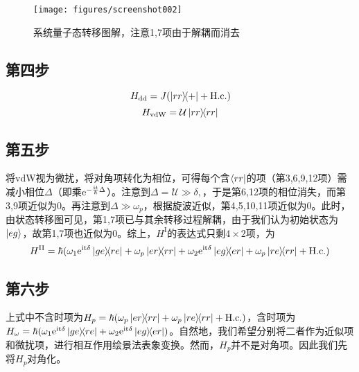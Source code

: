 \documentclass[
fontsetup = font-setup-open.tex,
titlesetup = titles-setup.tex
]{AJbook}
\numberwithin{equation}{section}
\begin{document}
\begin{figure}[htbp]
\centering
\texttt{[image: figures/screenshot002]}
\caption{系统量子态转移图解，注意1,7项由于解耦而消去}
\label{fig:screenshot002}
\end{figure}
\subsection{第四步}
\begin{equation}\label{key}
H_{\mathrm{dd}}=J(\ketbra{rr}{+}+\mathrm{H.c.})
\end{equation}
\begin{equation}\label{key}
H_{\mathrm{vdW}}=\mathcal{U}\ketbra{rr}{rr}
\end{equation}
\subsection{第五步}
将vdW视为微扰，将对角项转化为相位，可得每个含$ \bra{rr} $的项（第3,6,9,12项）需减小相位$ \Delta $（即乘$ \mathrm{e}^{-\frac{\mathrm{i}t}{\hbar} \Delta} $）。注意到$ \Delta=\mathcal{U}\gg\delta, $，于是第6,12项的相位消失，而第3,9项近似为0。再注意到$ \Delta\gg\omega_p $，根据旋波近似，第4,5,10,11项近似为0。此时，由状态转移图可见，第1,7项已与其余转移过程解耦，由于我们认为初始状态为$ \ket{eg} $，故第1,7项也近似为0。综上，$ H^{\mathrm{I}} $的表达式只剩$ 4\times 2 $项，为
\begin{equation}\label{key}
H^{\mathrm{II}}=\hbar(\omega_1\mathrm{e}^{\mathrm{it\delta}}\ketbra{ge}{re}
+\omega_p\ketbra{er}{rr}
+\omega_2\mathrm{e}^{\mathrm{it\delta}}\ketbra{eg}{er}
+\omega_p\ketbra{re}{rr}+\mathrm{H.c.})
\end{equation}
\subsection{第六步}
上式中不含时项为$ H_p=\hbar(\omega_p\ketbra{er}{rr}+\omega_p\ketbra{re}{rr}+\mathrm{H.c.}) $，含时项为$ H_\omega=\hbar(\omega_1\mathrm{e}^{\mathrm{it\delta}}\ketbra{ge}{re}+\omega_2\mathrm{e}^{\mathrm{it\delta}}\ketbra{eg}{er}) $。自然地，我们希望分别将二者作为近似项和微扰项，进行相互作用绘景法表象变换。然而，$ H_p $并不是对角项。因此我们先将$ H_p $对角化。
\end{document}
